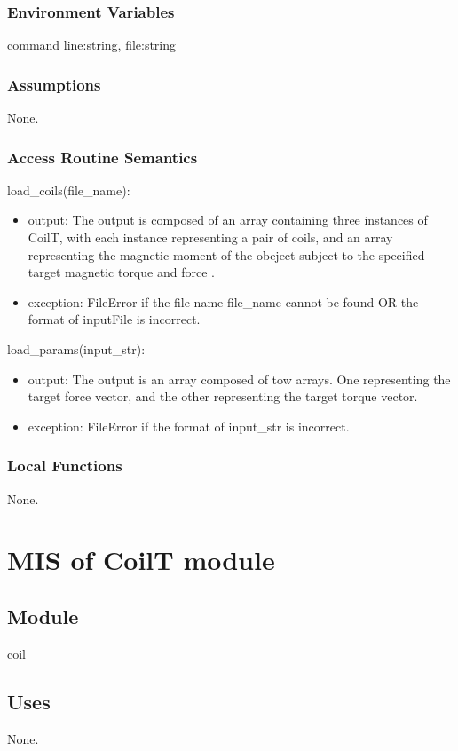 \documentclass[12pt, titlepage]{article}
\begin{document}
\subsubsection{Environment Variables}
command line:string, file:string
\subsubsection{Assumptions}
None.

\subsubsection{Access Routine Semantics}
\noindent load\_coils(file\_name):
\begin{itemize}
\item output: The output is composed of an array containing three instances of CoilT, with each instance representing a pair of coils, and an array representing the magnetic moment of the obeject subject to the specified target magnetic torque and force .  
\item exception: FileError if the file name file\_name cannot be found OR the format of inputFile is incorrect.
\end{itemize}
\noindent load\_params(input\_str):
\begin{itemize}
\item output: The output is an array composed of tow arrays. One representing the target force vector, and the other representing the target torque vector.
\item exception: FileError if the format of input\_str is incorrect.
\end{itemize}

\subsubsection{Local Functions}
None.


\section{MIS of CoilT module} \label{MCT}

\subsection{Module}
coil

\subsection{Uses}
None.
\end{document}
